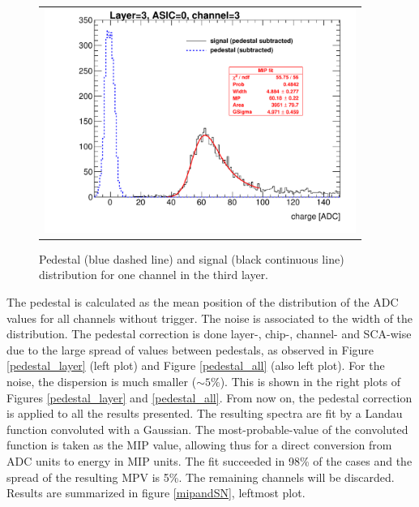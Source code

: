 \documentclass[a4paper,11pt]{article}
\begin{document}

\begin{figure}[!ht]
  \centering
  \begin{tabular}{l}
    \includegraphics[width=4in]{mip_pedestal_example-eps-converted-to.pdf}
  \end{tabular}
  \caption{Pedestal (blue dashed line) and signal (black continuous line) distribution for one channel in the third layer.}
\label{signal_pedestal}
\end{figure}

The pedestal is calculated as the mean position of
the distribution of the ADC values for all channels without trigger. The noise is
associated to the width of the distribution.
The pedestal correction is done layer-, chip-, channel- and SCA-wise due to the large spread of values between pedestals, as observed in 
Figure \ref{pedestal_layer} (left plot) and Figure \ref{pedestal_all} (also left plot).
For the noise, the dispersion is much smaller ($\sim 5 \%$). This is shown in the right plots of Figures \ref{pedestal_layer} and \ref{pedestal_all}.
From now on, the pedestal correction is applied to all the results presented.
The resulting spectra are fit by
a Landau function convoluted with a Gaussian.
The most-probable-value of the convoluted function is taken as the MIP value, allowing thus for a direct
conversion from ADC units to energy in MIP units.
The fit succeeded in 98\% of the cases and the spread of the resulting MPV is 5\%.
The remaining channels will be discarded. Results are summarized in figure \ref{mipandSN}, leftmost plot.
\end{document}
